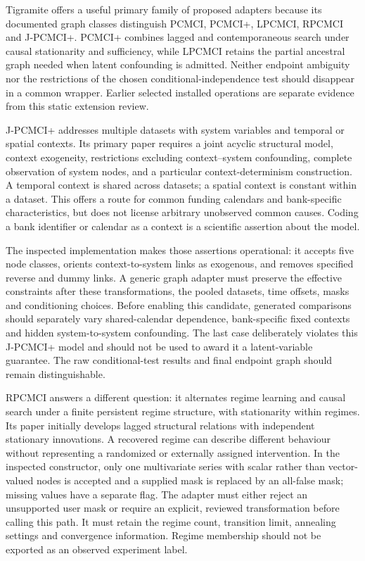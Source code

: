 Tigramite offers a useful primary family of proposed adapters because its
documented graph classes distinguish PCMCI, PCMCI+, LPCMCI, RPCMCI and
J-PCMCI+. PCMCI+ combines lagged and contemporaneous search under causal
stationarity and sufficiency, while LPCMCI retains the partial ancestral
graph needed when latent confounding is admitted. Neither endpoint
ambiguity nor the restrictions of the chosen conditional-independence test
should disappear in a common wrapper. Earlier selected installed operations
are separate evidence from this static extension review.
\citep{runge2020,gerhardus2020,runtime_tigramite_scope,exec14_pt_tigramite}

J-PCMCI+ addresses multiple datasets with system variables and temporal or
spatial contexts. Its primary paper requires a joint acyclic structural
model, context exogeneity, restrictions excluding context--system
confounding, complete observation of system nodes, and a particular
context-determinism construction. A temporal context is shared across
datasets; a spatial context is constant within a dataset. This offers a
route for common funding calendars and bank-specific characteristics, but
does not license arbitrary unobserved common causes. Coding a bank identifier
or calendar as a context is a scientific assertion about the model.
\citep{exec14_pt_paper_jpcmci}

The inspected implementation makes those assertions operational: it accepts
five node classes, orients context-to-system links as exogenous, and removes
specified reverse and dummy links. A generic graph adapter must preserve the
effective constraints after these transformations, the pooled datasets, time
offsets, masks and conditioning choices. Before enabling this candidate,
generated comparisons should separately vary shared-calendar dependence,
bank-specific fixed contexts and hidden system-to-system confounding. The
last case deliberately violates this J-PCMCI+ model and should not be used
to award it a latent-variable guarantee. The raw conditional-test results
and final endpoint graph should remain distinguishable.
\citep{exec14_pt_tigramite,exec14_pt_contract}

RPCMCI answers a different question: it alternates regime learning and
causal search under a finite persistent regime structure, with stationarity
within regimes. Its paper initially develops lagged structural relations
with independent stationary innovations. A recovered regime can describe
different behaviour without representing a randomized or externally assigned
intervention. In the inspected constructor, only one multivariate series with scalar rather than vector-valued nodes
is accepted and a supplied mask is replaced by an all-false mask;
missing values have a separate flag. The adapter must either reject an
unsupported user mask or require an explicit, reviewed transformation before
calling this path. It must retain the regime count, transition limit,
annealing settings and convergence information. Regime membership should
not be exported as an observed experiment label.
\citep{exec14_pt_paper_rpcmci,exec14_pt_tigramite}

